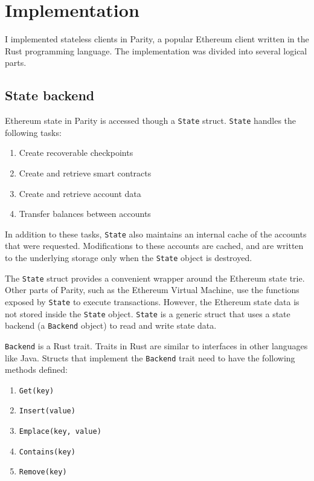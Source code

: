 \documentclass[12pt]{article}
\begin{document}
\section{Implementation}

I implemented stateless clients in Parity, a popular Ethereum client written in the Rust programming language. The implementation was divided into several logical parts.

\subsection{State backend}

Ethereum state in Parity is accessed though a \texttt{State} struct. \texttt{State} handles the following tasks:
\begin{enumerate}
  \item Create recoverable checkpoints
  \item Create and retrieve smart contracts
  \item Create and retrieve account data
  \item Transfer balances between accounts
\end{enumerate}

In addition to these tasks, \texttt{State} also maintains an internal cache of the accounts that were requested. Modifications to these accounts are cached, and are written to the underlying storage only when the \texttt{State} object is destroyed.

The \texttt{State} struct provides a convenient wrapper around the Ethereum state trie. Other parts of Parity, such as the Ethereum Virtual Machine, use the functions exposed by \texttt{State} to execute transactions. However, the Ethereum state data is not stored inside the \texttt{State} object. \texttt{State} is a generic struct that uses a state backend (a \texttt{Backend} object) to read and write state data.

\texttt{Backend} is a Rust trait. Traits in Rust are similar to interfaces in other languages like Java. Structs that implement the \texttt{Backend} trait need to have the following methods defined:

\begin{enumerate}
  \item \texttt{Get(key)}
  \item \texttt{Insert(value)}
  \item \texttt{Emplace(key, value)}
  \item \texttt{Contains(key)}
  \item \texttt{Remove(key)}
\end{enumerate}
\end{document}
